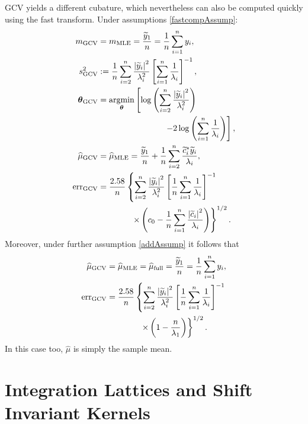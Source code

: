 \documentclass[twocolumn]{svjour3}          %
\newcommand{\bm}[1]{\boldsymbol{#1}}
\newcommand{\vtheta}{{\bm{\theta}}}
\newcommand{\hmu}{\widehat{\mu}}
\newcommand{\MLE}{\textup{MLE}}
\newcommand{\GCV}{\textup{GCV}}
\newcommand{\err}{\textup{err}}
\def\abs#1{\ensuremath{\left \lvert #1 \right \rvert}}
\providecommand{\argmin}{\operatorname*{argmin}}
\begin{document}
GCV yields a different cubature, which nevertheless can also be computed quickly using the fast transform.  Under assumptions \eqref{fastcompAssump}:
\begin{align}
\nonumber
m_{\textup{GCV}} & = m_\MLE =  \frac{\widetilde{y}_1}{n} = \frac 1n \sum_{i=1}^n y_i,\\
\nonumber 
s^2_{\textup{GCV}} & : =  \frac 1{n} \sum_{i=2}^n \frac{\abs{\widetilde{y}_i}^2}{\lambda_i^2}  \left [ \sum_{i=1}^n \frac{1}{\lambda_i} \right]^{-1}, \\
\nonumber 
\vtheta_{\GCV} 
&= \argmin_\vtheta \left[ \log \left ( \sum_{i=2}^n \frac{\abs{\widetilde{y}_i}^2}{\lambda_i^2} 
\right) \right .\\
\label{thetaGCV}
& \qquad \qquad \qquad \qquad  \left . -2\log\left( \sum_{i=1}^n \frac{1}{\lambda_i} \right)
\right], \\
\nonumber
\hmu_{\GCV}
&= \hmu_\MLE  = \frac{\widetilde{y}_1}{n} +
\frac 1n \sum_{i=2}^n \frac{ \widetilde{c}_i^* \widetilde{y}_i}{\lambda_i}, \\
\nonumber
\err_{\textup{GCV}} & =
\frac{2.58}{n}\left\{\sum_{i=2}^n \frac{\abs{\widetilde{y}_i}^2}{\lambda_i^2}  \left [ \frac 1n \sum_{i=1}^n \frac{1}{\lambda_i} \right]^{-1} \right.
\\ 
\nonumber
&\qquad \qquad \left . \times
\left( c_0 - \frac 1n \sum_{i=1}^n \frac{\abs{\widetilde{c}_i}^2}{\lambda_i} \right) 
\right\}^{1/2}.
\end{align}
Moreover, under further assumption \eqref{addAssump} it follows that 
\begin{align}
\nonumber %
\hmu_{\textup{GCV}}
&= \hmu_\MLE = \hmu_{\textup{full}} =
\frac{\widetilde{y}_1}{n} = \frac 1n \sum_{i=1}^n y_i,\\
\nonumber
\err_{\textup{GCV}} & =
\frac{2.58}{n}\left\{\sum_{i=2}^n \frac{\abs{\widetilde{y}_i}^2}{\lambda_i^2}  \left [ \frac 1n \sum_{i=1}^n \frac{1}{\lambda_i} \right]^{-1} \right.
\\ 
&\qquad \qquad \left . \times
\left( 1 -  \frac{n}{\lambda_1} \right)  
\right\}^{1/2}. \label{errGCVSimple}
\end{align}
In this case too, $\hmu$ is simply the sample mean.



\section{Integration Lattices and Shift Invariant Kernels}
\label{sec:shift_invariant_kernel}
\end{document}
